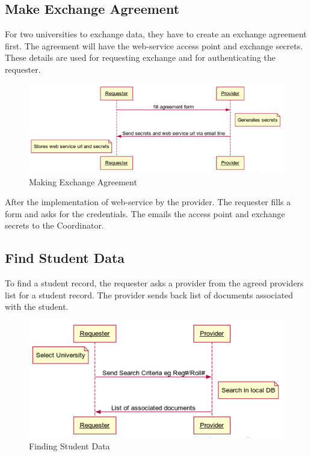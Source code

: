 \documentclass[12pt,a4paper,oneside]{book}
\begin{document}
    \subsection{Make Exchange Agreement}
    For two universities to exchange data, they have to create an exchange agreement first. The agreement will have the web-service access point and exchange secrets. These details are used for requesting exchange and for authenticating the requester.

\begin{figure}[!htp]
  \centering
  \includegraphics[width=14cm]{sq_agreement.png}
  \caption{Making Exchange Agreement}
  \label{fig:sq_agreement}
\end{figure}


After the implementation of web-service by the provider. The requester fills a form and asks for the credentials. The emails the access point and exchange secrets to the Coordinator.

    \subsection{Find Student Data}
    To find a student record, the requester asks a provider from the agreed providers list for a student record. The provider sends back list of documents associated with the student.

\begin{figure}[!hbp]
  \centering
  \includegraphics[width=14cm]{sq_find_student_data.png}
  \caption{Finding Student Data}
  \label{fig:sq_find_student_data}
\end{figure}
\end{document}
